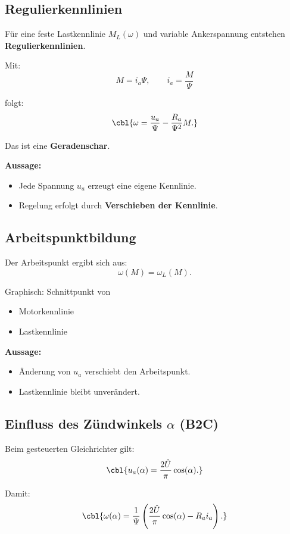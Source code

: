 \subsection{Regulierkennlinien}

Für eine feste Lastkennlinie $M_L(\omega)$
und variable Ankerspannung entstehen \textbf{Regulierkennlinien}.

Mit:
\[
M = i_a \Psi, \qquad i_a = \frac{M}{\Psi}
\]

folgt:
\[
\cbl{\omega = \frac{u_a}{\Psi} - \frac{R_a}{\Psi^2} M.}
\]

Das ist eine \textbf{Geradenschar}.



\textbf{Aussage:}
\begin{itemize}
    \item Jede Spannung $u_a$ erzeugt eine eigene Kennlinie.
    \item Regelung erfolgt durch \textbf{Verschieben der Kennlinie}.
\end{itemize}

\subsection{Arbeitspunktbildung}

Der Arbeitspunkt ergibt sich aus:
\[
\omega(M) = \omega_L(M).
\]

Graphisch: Schnittpunkt von
\begin{itemize}
    \item Motorkennlinie
    \item Lastkennlinie
\end{itemize}



\textbf{Aussage:}
\begin{itemize}
    \item Änderung von $u_a$ verschiebt den Arbeitspunkt.
    \item Lastkennlinie bleibt unverändert.
\end{itemize}

\subsection{Einfluss des Zündwinkels $\alpha$ (B2C)}

Beim gesteuerten Gleichrichter gilt:
\[
\cbl{u_a(\alpha) = \frac{2\hat U}{\pi} \cos(\alpha).}
\]

Damit:
\[
\cbl{\omega(\alpha) = \frac{1}{\Psi}
\left( \frac{2\hat U}{\pi} \cos(\alpha) - R_a i_a \right).}
\]

